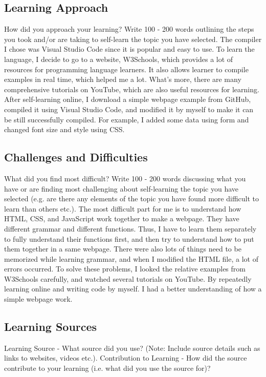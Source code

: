 \documentclass[a4paper, 11pt]{report}
\begin{document}
\subsection{Learning Approach}
How did you approach your learning? Write 100 - 200 words outlining the steps you took and/or are taking to self-learn the topic you have selected.
\newline
\newline
The compiler I chose was Visual Studio Code since it is popular and easy to use. To learn the language, I decide to go to a website, W3Schools, which provides a lot of resources for programming language learners. It also allows learner to compile examples in real time, which helped me a lot. What’s more, there are many comprehensive tutorials on YouTube, which are also useful resources for learning. After self-learning online, I download a simple webpage example from GitHub, compiled it using Visual Studio Code, and modified it by myself to make it can be still successfully compiled. For example, I added some data using form and changed font size and style using CSS.

\subsection{Challenges and Difficulties}
What did you find most difficult? Write 100 - 200 words discussing what you have or are finding most challenging about self-learning the topic you have selected (e.g. are there any elements of the topic you have found more difficult to learn than others etc.).
\newline
\newline
The most difficult part for me is to understand how HTML, CSS, and JavaScript work together to make a webpage. They have different grammar and different functions. Thus, I have to learn them separately to fully understand their functions first, and then try to understand how to put them together in a same webpage. There were also lots of things need to be memorized while learning grammar, and when I modified the HTML file, a lot of errors occurred. To solve these problems, I looked the relative examples from W3Schools carefully, and watched several tutorials on YouTube. By repeatedly learning online and writing code by myself. I had a better understanding of how a simple webpage work.

\subsection{Learning Sources}
Learning Source - What source did you use? (Note: Include source details such as links to websites, videos etc.).	Contribution to Learning - How did the source contribute to your learning (i.e. what did you use the source for)?
\end{document}
